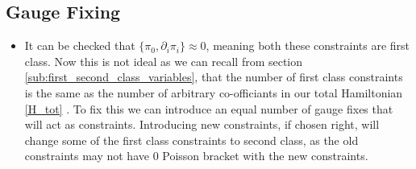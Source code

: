 \documentclass[11pt]{article}
\numberwithin{equation}{section}
\begin{document}
\subsection{Gauge Fixing} %
\label{sub:gauge_fixing}
\begin{itemize}
   \item It can be checked that $\{\pi_0,\partial_i\pi_i \} \approx 0$, meaning both these constraints are first class. Now this is not ideal as we can recall from section \ref{sub:first_second_class_variables}, that the number of first class constraints is the same as the number of arbitrary co-officiants in our total Hamiltonian \ref{H_tot} . To fix this we can introduce an equal number of gauge fixes that will act as constraints. Introducing new constraints, if chosen right, will change some of the first class constraints to second class, as the old constraints may not have $0$ Poisson bracket with the new constraints.  


\end{itemize}
\end{document}
